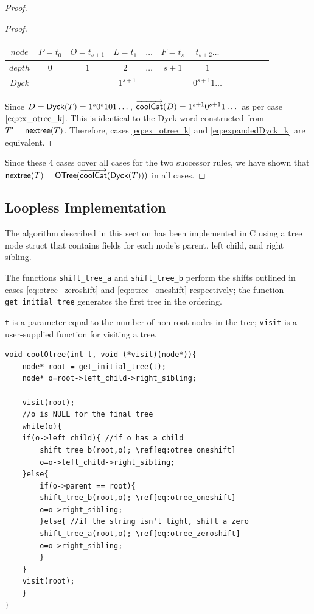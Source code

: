 \begin{proof}
\begin{proof}
\begin{center}
\begin{tabular}{ |c|c|c|c|c|c|c|c|c|c|c|c| }
	    $node$ & $P=t_0$ & $O=t_{s+1}$& $L=t_1$ & $\dots$ & $F=t_s$  & $t_{s+2}\dots$ \\
	    \hline
	    $depth$ & $0$ & $1$ & $2$ & $\dots$ & $s+1$ & $1$  \\
	    \hline
	    $Dyck$ &  &  \multicolumn{4}{|c|}{$1^{s+1}$} &  $0^{s+1}1\dots$   \\
	    \hline
	\end{tabular}
    \end{center}

Since $D=\mathsf{Dyck}{(T)}=1^s0^s101\dots$, $\overrightarrow{\mathsf{coolCat}}{(D)}=1^{s+1}0^{s+1}1\dots$ as per case $\ref{eq:ex_otree_k}$.  This is identical to the Dyck word constructed from $T'=\mathsf{nextree}{(T)}$.  Therefore, cases \ref{eq:ex_otree_k} and \ref{eq:expandedDyck_k} are equivalent.

\end{proof}

Since these 4 cases cover all cases for the two successor rules, we have shown that $\mathsf{nextree}{(T)}=\mathsf{OTree}{(\overrightarrow{\mathsf{coolCat}}{(\mathsf{Dyck}{(T)})})}$ in all cases. 
\end{proof}
\subsection{Loopless Implementation}
The algorithm described in this section has been implemented in C using a tree node struct that contains fields for each node's parent, left child, and right sibling.

The functions \verb+shift_tree_a+ and \verb+shift_tree_b+ perform the shifts outlined in cases \ref{eq:otree_zeroshift} and \ref{eq:otree_oneshift} respectively; the function \verb+get_initial_tree+ generates the first tree in the ordering.

\verb$t$ is a parameter equal to the number of non-root nodes in the tree; \verb$visit$ is a user-supplied function for visiting a tree.

\begin{Verbatim}[commandchars=\\\[\]]
void coolOtree(int t, void (*visit)(node*)){
    node* root = get_initial_tree(t);
    node* o=root->left_child->right_sibling;

    visit(root);
    //o is NULL for the final tree
    while(o){ 
	if(o->left_child){ //if o has a child
	    shift_tree_b(root,o); \ref[eq:otree_oneshift]
	    o=o->left_child->right_sibling;
	}else{
	    if(o->parent == root){ 
		shift_tree_b(root,o); \ref[eq:otree_oneshift]
		o=o->right_sibling;
	    }else{ //if the string isn't tight, shift a zero
		shift_tree_a(root,o); \ref[eq:otree_zeroshift]
		o=o->right_sibling;
	    }
	}
	visit(root);
    }
}
\end{Verbatim}

